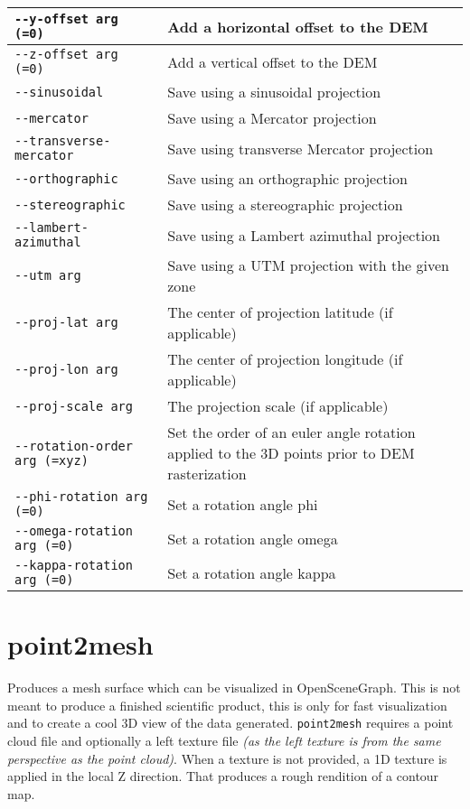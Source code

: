 \begin{longtable}{|l|p{10cm}|}
\verb#--y-offset arg (=0)# & Add a horizontal offset to the DEM \\ \hline
\verb#--z-offset arg (=0)# & Add a vertical offset to the DEM \\ \hline
\verb#--sinusoidal# & Save using a sinusoidal projection \\ \hline
\verb#--mercator# & Save using a Mercator projection \\ \hline
\verb#--transverse-mercator# & Save using transverse Mercator projection \\ \hline
\verb#--orthographic# & Save using an orthographic projection \\ \hline
\verb#--stereographic# & Save using a stereographic projection \\ \hline
\verb#--lambert-azimuthal# & Save using a Lambert azimuthal projection \\ \hline
\verb#--utm arg# & Save using a UTM projection with the given zone \\ \hline
\verb#--proj-lat arg# & The center of projection latitude (if applicable) \\ \hline
\verb#--proj-lon arg# & The center of projection longitude (if applicable) \\ \hline
\verb#--proj-scale arg# & The projection scale (if applicable) \\ \hline
\verb#--rotation-order arg (=xyz)# & Set the order of an euler angle rotation applied to the 3D points prior to DEM rasterization \\ \hline
\verb#--phi-rotation arg (=0)# & Set a rotation angle phi \\ \hline
\verb#--omega-rotation arg (=0)# & Set a rotation angle omega \\ \hline
\verb#--kappa-rotation arg (=0)# & Set a rotation angle kappa \\ \hline
\end{longtable}

\section{point2mesh}
\label{point2mesh}

Produces a mesh surface which can be visualized in
OpenSceneGraph. This is not meant to produce a finished scientific
product, this is only for fast visualization and to create a cool 3D
view of the data generated. \verb#point2mesh# requires a point cloud
file and optionally a left texture file \emph{(as the left texture is
  from the same perspective as the point cloud)}. When a texture is
not provided, a 1D texture is applied in the local Z direction. That
produces a rough rendition of a contour map.

